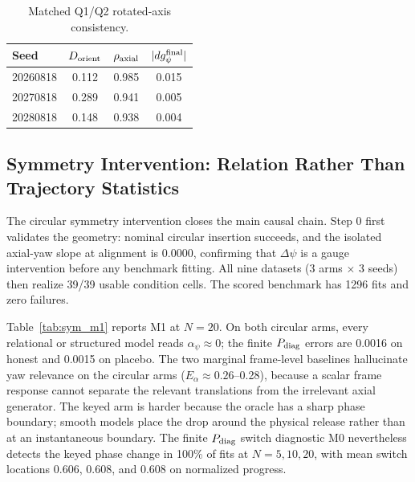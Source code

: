 \documentclass[letterpaper,10pt,conference]{ieeeconf}
\begin{document}
\begin{table}[t]
\centering
\caption{Matched Q1/Q2 rotated-axis consistency.}
\label{tab:rotated}
\small
\setlength{\tabcolsep}{4.2pt}
\begin{tabular}{lccc}
\toprule
Seed & $D_{\rm orient}$ & $\rho_{\rm axial}$ & $|d g_{\psi}^{\rm final}|$\\
\midrule
20260818 & 0.112 & 0.985 & 0.015\\
20270818 & 0.289 & 0.941 & 0.005\\
20280818 & 0.148 & 0.938 & 0.004\\
\bottomrule
\end{tabular}
\end{table}

\subsection{Symmetry Intervention: Relation Rather Than Trajectory Statistics}

The circular symmetry intervention closes the main causal chain. Step 0 first
validates the geometry: nominal circular insertion succeeds, and the isolated
axial-yaw slope at alignment is 0.0000, confirming that $\Delta\psi$ is a gauge
intervention before any benchmark fitting. All nine datasets
(3 arms $\times$ 3 seeds) then realize 39/39 usable condition cells. The scored
benchmark has 1296 fits and zero failures.

Table~\ref{tab:sym_m1} reports M1 at $N=20$. On both circular arms, every
relational or structured model reads $\alpha_\psi\approx0$; the finite
$P_{\rm diag}$ errors are 0.0016 on honest and 0.0015 on placebo. The two
marginal frame-level baselines hallucinate yaw relevance on the circular arms
($E_\alpha\approx0.26$--0.28), because a scalar frame response cannot separate
the relevant translations from the irrelevant axial generator. The keyed arm is
harder because the oracle has a sharp phase boundary; smooth models place the
drop around the physical release rather than at an instantaneous boundary.
The finite $P_{\rm diag}$ switch diagnostic M0 nevertheless detects the keyed
phase change in 100\% of fits at $N=5,10,20$, with mean switch locations
0.606, 0.608, and 0.608 on normalized progress.
\end{document}
